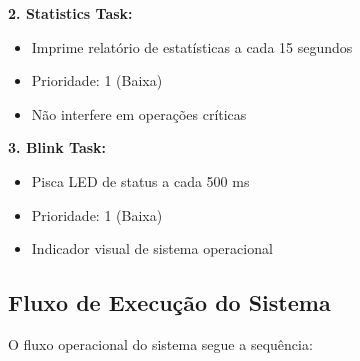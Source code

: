 \documentclass[12pt,a4paper]{article}
\begin{document}
\textbf{2. Statistics Task:}
\begin{itemize}
    \item Imprime relatório de estatísticas a cada 15 segundos
    \item Prioridade: 1 (Baixa)
    \item Não interfere em operações críticas
\end{itemize}

\textbf{3. Blink Task:}
\begin{itemize}
    \item Pisca LED de status a cada 500 ms
    \item Prioridade: 1 (Baixa)
    \item Indicador visual de sistema operacional
\end{itemize}

\subsection{Fluxo de Execução do Sistema}

O fluxo operacional do sistema segue a sequência:
\end{document}

